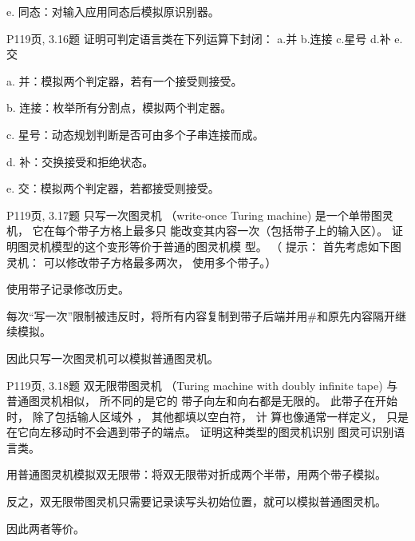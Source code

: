 \documentclass[11pt,addpoints,answers]{exam}
\begin{document}
\begin{questions}
\begin{solution}
            e. 同态：对输入应用同态后模拟原识别器。
			
		\end{solution}  
		
		\question P119页, 3.16题
		证明可判定语言类在下列运算下封闭：
		a.并 b.连接 c.星号 d.补 e.交
		\begin{solution}
			
            a. 并：模拟两个判定器，若有一个接受则接受。  

            b. 连接：枚举所有分割点，模拟两个判定器。  
            
            c. 星号：动态规划判断是否可由多个子串连接而成。  
            
            d. 补：交换接受和拒绝状态。  
            
            e. 交：模拟两个判定器，若都接受则接受。
			
		\end{solution}   
		
		
		\question P119页, 3.17题
		只写一次图灵机 （write-once Turing machine) 是一个单带图灵机， 它在每个带子方格上最多只
		能改变其内容一次（包括带子上的输入区）。 证明图灵机模型的这个变形等价于普通的图灵机模
		型。 （ 提示： 首先考虑如下图灵机： 可以修改带子方格最多两次， 使用多个带子。）
		\begin{solution}
			
            使用带子记录修改历史。
            
            每次“写一次”限制被违反时，将所有内容复制到带子后端并用$\#$和原先内容隔开继续模拟。
            
            因此只写一次图灵机可以模拟普通图灵机。
			
		\end{solution}  
		
		\question P119页, 3.18题
		双无限带图灵机 （Turing machine with doubly infinite tape) 与普通图灵机相似， 所不同的是它的
		带子向左和向右都是无限的。 此带子在开始时， 除了包括输人区域外 ， 其他都填以空白符， 计
		算也像通常一样定义， 只是在它向左移动时不会遇到带子的端点。 证明这种类型的图灵机识别
		图灵可识别语言类。
		\begin{solution}
			
            用普通图灵机模拟双无限带：将双无限带对折成两个半带，用两个带子模拟。
            
            反之，双无限带图灵机只需要记录读写头初始位置，就可以模拟普通图灵机。
            
            因此两者等价。
			

\end{solution}
\end{questions}
\end{document}
